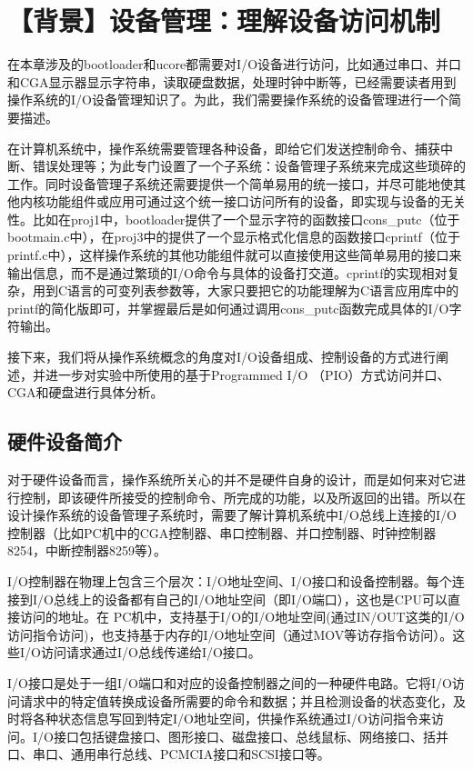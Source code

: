 \section{【背景】设备管理：理解设备访问机制}\label{ux80ccux666fux8bbeux5907ux7ba1ux7406ux7406ux89e3ux8bbeux5907ux8bbfux95eeux673aux5236}

在本章涉及的bootloader和ucore都需要对I/O设备进行访问，比如通过串口、并口和CGA显示器显示字符串，读取硬盘数据，处理时钟中断等，已经需要读者用到操作系统的I/O设备管理知识了。为此，我们需要操作系统的设备管理进行一个简要描述。

在计算机系统中，操作系统需要管理各种设备，即给它们发送控制命令、捕获中断、错误处理等；为此专门设置了一个子系统：设备管理子系统来完成这些琐碎的工作。同时设备管理子系统还需要提供一个简单易用的统一接口，并尽可能地使其他内核功能组件或应用可通过这个统一接口访问所有的设备，即实现与设备的无关性。比如在proj1中，bootloader提供了一个显示字符的函数接口cons\_putc（位于bootmain.c中），在proj3中的提供了一个显示格式化信息的函数接口cprintf（位于printf.c中），这样操作系统的其他功能组件就可以直接使用这些简单易用的接口来输出信息，而不是通过繁琐的I/O命令与具体的设备打交道。cprintf的实现相对复杂，用到C语言的可变列表参数等，大家只要把它的功能理解为C语言应用库中的printf的简化版即可，并掌握最后是如何通过调用cons\_putc函数完成具体的I/O字符输出。

接下来，我们将从操作系统概念的角度对I/O设备组成、控制设备的方式进行阐述，并进一步对实验中所使用的基于Programmed
I/O （PIO）方式访问并口、CGA和硬盘进行具体分析。

\subsection{硬件设备简介}\label{ux786cux4ef6ux8bbeux5907ux7b80ux4ecb}

对于硬件设备而言，操作系统所关心的并不是硬件自身的设计，而是如何来对它进行控制，即该硬件所接受的控制命令、所完成的功能，以及所返回的出错。所以在设计操作系统的设备管理子系统时，需要了解计算机系统中I/O总线上连接的I/O控制器（比如PC机中的CGA控制器、串口控制器、并口控制器、时钟控制器8254，中断控制器8259等）。

I/O控制器在物理上包含三个层次：I/O地址空间、I/O接口和设备控制器。每个连接到I/O总线上的设备都有自己的I/O地址空间（即I/O端口），这也是CPU可以直接访问的地址。在
PC机中，支持基于I/O的I/O地址空间(通过IN/OUT这类的I/O访问指令访问)，也支持基于内存的I/O地址空间（通过MOV等访存指令访问）。这些I/O访问请求通过I/O总线传递给I/O接口。

I/O接口是处于一组I/O端口和对应的设备控制器之间的一种硬件电路。它将I/O访问请求中的特定值转换成设备所需要的命令和数据；并且检测设备的状态变化，及时将各种状态信息写回到特定I/O地址空间，供操作系统通过I/O访问指令来访问。I/O接口包括键盘接口、图形接口、磁盘接口、总线鼠标、网络接口、括并口、串口、通用串行总线、PCMCIA接口和SCSI接口等。

